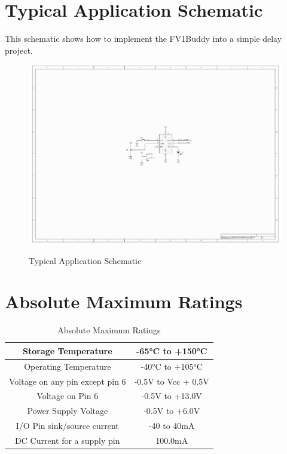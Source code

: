 \documentclass[a4paper, 10pt]{article}
\begin{document}
\section{Typical Application Schematic}
\label{sec:typappsche}
\bigbreak
This schematic shows how to implement the FV1Buddy into a simple delay project.
\vfill
\begin{figure} [h!]
\begin{center}
\includegraphics[scale=2]{Schematic}
\label{Schem}
\caption{Typical Application Schematic}
\end{center}
\end{figure}
\vfill
\newpage
\section{Absolute Maximum Ratings}
\bigbreak
\begin{table}[h!]
\centering
\begin{tabular}{|c|c|}
\hline
Storage Temperature	& -65°C to +150°C\\
\hline
Operating Temperature & -40°C to +105°C\\
\hline
Voltage on any pin except pin 6	& -0.5V to Vcc + 0.5V\\
\hline
Voltage on Pin 6 & -0.5V to +13.0V\\
\hline
Power Supply Voltage & -0.5V to +6.0V\\
\hline
I/O Pin sink/source current & -40 to 40mA\\
\hline
DC Current for a supply pin & 100.0mA\\
\hline
\end{tabular}
\caption{Absolute Maximum Ratings}
\end{table}
\bigbreak
\bigbreak
\end{document}
